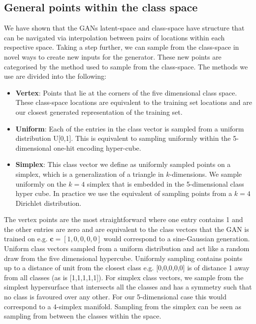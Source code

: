 \documentclass[12pt]{iopart}
\begin{document}
\subsection{General points within the class space}
We have shown that the \acp{GAN} latent-space and class-space have structure that can be navigated via interpolation between pairs of locations within each respective space. Taking a step further, we can sample from the class-space in novel ways to create new inputs for the generator. These new points are categorised by the method used to sample from the class-space. The methods we use are divided into the following: 
%
\begin{itemize}
%
\item {\bf Vertex}: Points that lie at the corners of the five dimensional class space. These class-space locations are equivalent to the training set locations and are our closest generated representation of the training set.
%
\item {\bf Uniform}: Each of the entries in the class vector is sampled from a uniform distribution U[0,1]. This is equivalent to sampling uniformly within the 5-dimensional one-hit encoding hyper-cube.
%
\item {\bf Simplex}: This class vector we define as uniformly sampled points on a simplex, which is a generalization of a triangle in $k$-dimensions. We sample uniformly on the $k=4$ simplex that is embedded in the 5-dimensional class hyper cube. In practice we use the equivalent of sampling points from a $k=4$ Dirichlet distribution.
%
\end{itemize}

The vertex points are the most straightforward where one entry contains 1 and the other entries are zero and are equivalent to the class vectors that the GAN is trained on e.g. $\mathbf{c} = [1,0,0,0,0]$ would correspond to a sine-Gaussian generation. Uniform class vectors sampled from a uniform distribution and act like a random draw from the five dimensional hypercube. Uniformly sampling contains points up to a distance of unit from the closest class e.g. [0,0,0,0,0] is of distance 1 away from all classes (as is [1,1,1,1,1]). For simplex class vectors, we sample from the simplest hypersurface that intersects all the classes and has a symmetry such that no class is favoured over any other. For our 5-dimensional case this would correspond to a 4-simplex manifold. Sampling from the simplex can be seen as sampling from between the classes within the space.  
\end{document}
